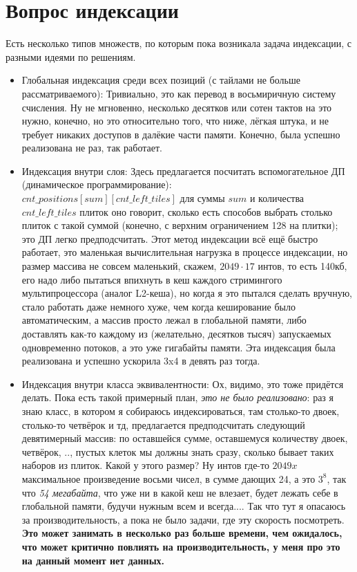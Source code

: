 \documentclass[12pt]{article}
\begin{document}
\section{Вопрос индексации}
Есть несколько типов множеств, по которым пока возникала задача индексации, с разными идеями по решениям.\\
\begin{itemize}
  \item Глобальная индексация среди всех позиций (с тайлами не больше рассматриваемого): Тривиально, это как перевод в восьмиричную систему счисления. Ну не мгновенно, несколько десятков или сотен тактов на это нужно, конечно, но это относительно того, что ниже, лёгкая штука, и не требует никаких доступов в далёкие части памяти. Конечно, была успешно реализована не раз, так работает.\\
  \item Индексация внутри слоя: Здесь предлагается посчитать вспомогательное ДП (динамическое программирование):\\ $cnt\_positions[sum][cnt\_left\_tiles]$ для суммы $sum$ и количества $cnt\_left\_tiles$ плиток оно говорит, сколько есть способов выбрать столько плиток с такой суммой (конечно, с верхним ограничением 128 на плитки); это ДП легко предподсчитать. Этот метод индексации всё ещё быстро работает, это маленькая вычислительная нагрузка в процессе индексации, но размер массива не совсем маленький, скажем, $2049 \cdot 17$ интов, то есть 140кб, его надо либо пытаться впихнуть в кеш каждого стримингого мультипроцессора (аналог L2-кеша), но когда я это пытался сделать вручную, стало работать даже немного хуже, чем когда кеширование было автоматическим, а массив просто лежал в глобальной памяти, либо доставлять как-то каждому из (желательно, десятков тысяч) запускаемых одновременно потоков, а это уже гигабайты памяти. Эта индексация была реализована и успешно ускорила 3x4 в девять раз тогда.\\
  \item Индексация внутри класса эквивалентности: Ох, видимо, это тоже придётся делать. Пока есть такой примерный план, \textit{это не было реализовано}: раз я знаю класс, в котором я собираюсь индексироваться, там столько-то двоек, столько-то четвёрок и тд, предлагается предподсчитать следующий девятимерный массив: по оставшейся сумме, оставшемуся количеству двоек, четвёрок, .., пустых клеток мы должны знать сразу, сколько бывает таких наборов из плиток. Какой у этого размер? Ну интов где-то $2049x$ максимальное произведение восьми чисел, в сумме дающих 24, а это $3^8$, так что \textit{54 мегабайта}, что уже ни в какой кеш не влезает, будет лежать себе в глобальной памяти, будучи нужным всем и всегда.... Так что тут я опасаюсь за производительность, а пока не было задачи, где эту скорость посмотреть. \textbf{Это может занимать в несколько раз больше времени, чем ожидалось, что может критично повлиять на производительность, у меня про это на данный момент нет данных.}\\

\end{itemize}
\end{document}
